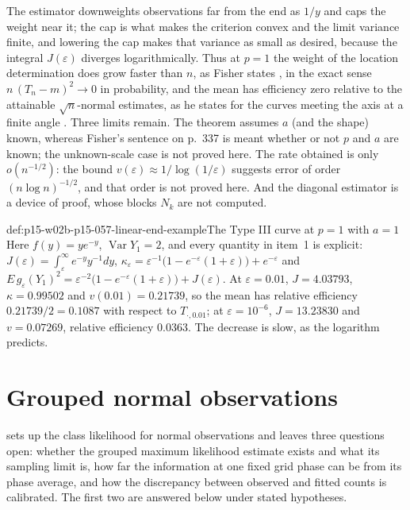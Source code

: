 The estimator downweights observations far from the end as \(1/y\) and
caps the weight near it; the cap is what makes the criterion convex and the
limit variance finite, and lowering the cap makes that variance as small as
desired, because the integral \(J(\varepsilon)\) diverges logarithmically.
Thus at \(p=1\) the weight of the location determination does grow faster
than \(n\), as Fisher states \cite[p.~337]{Fisher1922Foundations}, in the
exact sense \(n\,(T_n-m)^2\to0\) in probability, and the mean has
efficiency zero relative to the attainable \(\sqrt n\)-normal estimates, as
he states for the curves meeting the axis at a finite angle
\cite[pp.~347--348]{Fisher1922Foundations}. Three limits remain. The
theorem assumes \(a\) (and the shape) known, whereas Fisher's sentence on
p.~337 is meant whether or not \(p\) and \(a\) are known; the unknown-scale
case is not proved here. The rate obtained is only
\(o(n^{-1/2})\): the bound \(v(\varepsilon)\approx1/\log(1/\varepsilon)\)
suggests error of order \((n\log n)^{-1/2}\), and that order is not proved
here. And the diagonal estimator is a device of proof, whose blocks
\(N_k\) are not computed.

\begin{hbexample}{def:p15-w02b-p15-057-linear-end-example}{The Type III curve at \(p=1\) with \(a=1\)}
Here \(f(y)=ye^{-y}\), \(\operatorname{Var}Y_1=2\), and every quantity in
item~1 is explicit:
\(J(\varepsilon)=\int_\varepsilon^\infty e^{-y}y^{-1}dy\),
\(\kappa_\varepsilon=\varepsilon^{-1}\bigl(1-e^{-\varepsilon}(1+\varepsilon)\bigr)+e^{-\varepsilon}\)
and
\(E\,g_\varepsilon(Y_1)^2=\varepsilon^{-2}\bigl(1-e^{-\varepsilon}(1+\varepsilon)\bigr)+J(\varepsilon)\).
At \(\varepsilon=0.01\), \(J=4.03793\), \(\kappa=0.99502\) and
\(v(0.01)=0.21739\), so the mean has relative efficiency
\(0.21739/2=0.1087\) with respect to \(T_{\cdot,0.01}\); at
\(\varepsilon=10^{-6}\), \(J=13.23830\) and \(v=0.07269\), relative
efficiency \(0.0363\). The decrease is slow, as the logarithm predicts.
\end{hbexample}

\section{Grouped normal observations}
\label{sec:p15-w02b-p15-057-grouped}

 sets up the class likelihood for normal
observations and leaves three questions open: whether the grouped
maximum likelihood estimate exists and what its sampling limit is, how
far the information at one fixed grid phase can be from its phase average,
and how the discrepancy between observed and fitted counts is calibrated.
The first two are answered below under stated hypotheses.

